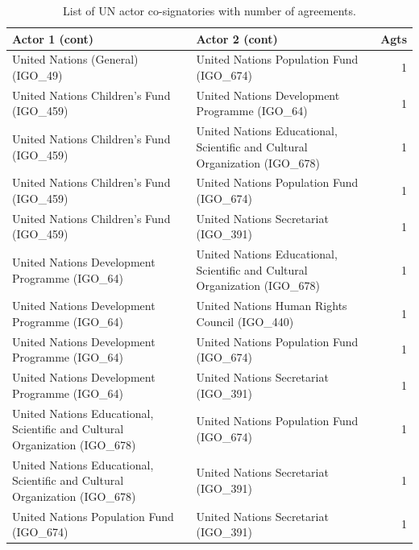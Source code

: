 \documentclass{article}
\begin{document}
\begin{table}[H]
\begin{center}
\small
\begin{tabularx}{\textwidth}{|X|X|r|}
    \hline
    \textbf{Actor 1 (cont)} & \textbf{Actor 2 (cont)} & \textbf{Agts} \\
    \hline
    \hline
United Nations (General) (IGO\_49) & United Nations Population Fund (IGO\_674) & 1 \\
\hline
United Nations Children's Fund (IGO\_459) & United Nations Development Programme (IGO\_64) & 1 \\
\hline
United Nations Children's Fund (IGO\_459) & United Nations Educational, Scientific and Cultural Organization (IGO\_678) & 1 \\
\hline
United Nations Children's Fund (IGO\_459) & United Nations Population Fund (IGO\_674) & 1 \\
\hline
United Nations Children's Fund (IGO\_459) & United Nations Secretariat (IGO\_391) & 1 \\
\hline
United Nations Development Programme (IGO\_64) & United Nations Educational, Scientific and Cultural Organization (IGO\_678) & 1 \\
\hline
United Nations Development Programme (IGO\_64) & United Nations Human Rights Council (IGO\_440) & 1 \\
\hline
United Nations Development Programme (IGO\_64) & United Nations Population Fund (IGO\_674) & 1 \\
\hline
United Nations Development Programme (IGO\_64) & United Nations Secretariat (IGO\_391) & 1 \\
\hline
United Nations Educational, Scientific and Cultural Organization (IGO\_678) & United Nations Population Fund (IGO\_674) & 1 \\
\hline
United Nations Educational, Scientific and Cultural Organization (IGO\_678) & United Nations Secretariat (IGO\_391) & 1 \\
\hline
United Nations Population Fund (IGO\_674) & United Nations Secretariat (IGO\_391) & 1 \\
\hline
\end{tabularx}
\end{center}
\normalsize
\caption{List of UN actor co-signatories with number of agreements.}
\end{table}
\end{document}
